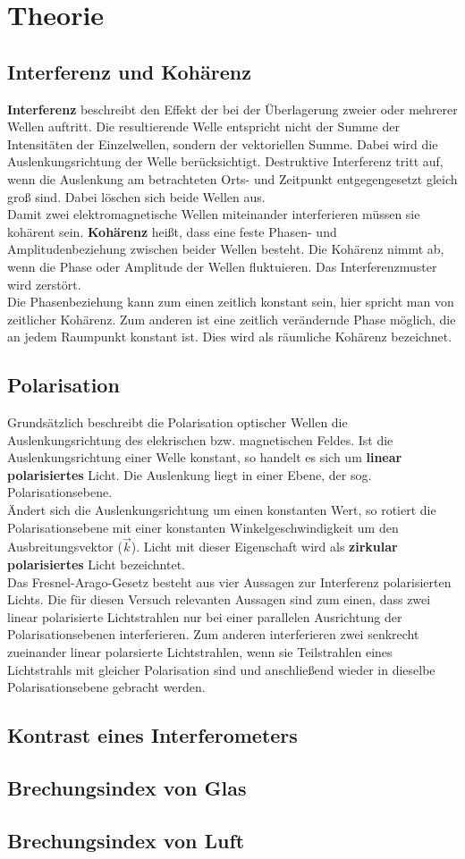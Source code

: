 \section{Theorie}
\label{sec:Theorie}

\subsection{Interferenz und Kohärenz}
\textbf{Interferenz} beschreibt den Effekt der bei der Überlagerung zweier oder mehrerer Wellen auftritt.
Die resultierende Welle entspricht nicht der Summe der Intensitäten der Einzelwellen, sondern der vektoriellen Summe.
Dabei wird die Auslenkungsrichtung der Welle berücksichtigt.
Destruktive Interferenz tritt auf, wenn die Auslenkung am betrachteten Orts- und Zeitpunkt entgegengesetzt gleich groß sind.
Dabei löschen sich beide Wellen aus.
\\
Damit zwei elektromagnetische Wellen miteinander interferieren müssen sie kohärent sein.
\textbf{Kohärenz} heißt, dass eine feste Phasen- und Amplitudenbeziehung zwischen beider Wellen besteht.
Die Kohärenz nimmt ab, wenn die Phase oder Amplitude der Wellen fluktuieren.
Das Interferenzmuster wird zerstört.
\\
Die Phasenbeziehung kann zum einen zeitlich konstant sein, hier spricht man von zeitlicher Kohärenz.
Zum anderen ist eine zeitlich verändernde Phase möglich, die an jedem Raumpunkt konstant ist.
Dies wird als räumliche Kohärenz bezeichnet.

\subsection{Polarisation}
Grundsätzlich beschreibt die Polarisation optischer Wellen die Auslenkungsrichtung des elekrischen bzw. magnetischen Feldes.
Ist die Auslenkungsrichtung einer Welle konstant, so handelt es sich um \textbf{linear polarisiertes} Licht.
Die Auslenkung liegt in einer Ebene, der sog. Polarisationsebene.
\\
Ändert sich die Auslenkungsrichtung um einen konstanten Wert, so rotiert die Polarisationsebene mit einer konstanten Winkelgeschwindigkeit um den Ausbreitungsvektor ($\vec{k}$).
Licht mit dieser Eigenschaft wird als \textbf{zirkular polarisiertes} Licht bezeichntet.
\\
Das Fresnel-Arago-Gesetz\cite{hecht2018optik} besteht aus vier Aussagen zur Interferenz polarisierten Lichts.
Die für diesen Versuch relevanten Aussagen sind zum einen, dass zwei linear polarisierte Lichtstrahlen nur bei einer parallelen Ausrichtung der Polarisationsebenen interferieren.
Zum anderen interferieren zwei senkrecht zueinander linear polarsierte Lichtstrahlen, wenn sie Teilstrahlen eines Lichtstrahls mit gleicher Polarisation sind und anschließend wieder in dieselbe Polarisationsebene gebracht werden.

\subsection{Kontrast eines Interferometers}

\subsection{Brechungsindex von Glas}


\subsection{Brechungsindex von Luft}